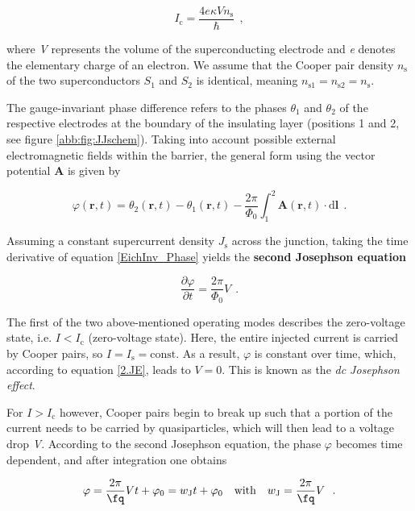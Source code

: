 \begin{equation}
I_\mathrm{c} = \frac{4e\kappa V n_\mathrm{s}}{\hbar} \ \ ,
\end{equation}

where \textit{V} represents the volume of the superconducting electrode and \textit{e} denotes the elementary charge of an electron. We assume that the Cooper pair density $n_\mathrm{s}$ of the two superconductors $S_1$ and $S_2$ is identical, meaning $n_{\mathrm{s}1} = n_{\mathrm{s}2} = n_\mathrm{s}$.

The gauge-invariant phase difference refers to the phases $\theta_1$ and $\theta_2$ of the respective electrodes at the boundary of the insulating layer (positions 1 and 2, see figure \ref{abb:fig:JJschem}). Taking into account possible external electromagnetic fields within the barrier, the general form using the vector potential \textbf{A} is given by \cite{Gross2016}

\begin{equation}
\label{EichInv_Phase}
\varphi(\textbf{r},t) = \theta_2(\textbf{r},t) - \theta_1(\textbf{r},t) - \frac{2\pi}{\Phi_0}\int_{1}^{2}\textbf{A}(\textbf{r},t)\cdot \mathrm{d}\textbf{l} \ \ .
\end{equation}

Assuming a constant supercurrent density $J_\mathrm{s}$ across the junction, taking the time derivative of equation \eqref{EichInv_Phase} yields the \textbf{second Josephson equation} \cite{Josephson1965}

\begin{equation}
\label{2.JE}
\frac{\partial\varphi}{\partial t} = \frac{2\pi}{\Phi_0}V \ \ .
\end{equation}

The first of the two above-mentioned operating modes describes the zero-voltage state, i.e.  $I<I_\mathrm{c}$ (zero-voltage state). Here, the entire injected current is carried by Cooper pairs, so $I=I_\mathrm{s}=\mathrm{const}$. As a result, $\varphi$ is constant over time, which, according to equation \eqref{2.JE}, leads to $V=0$. This is known as the \textit{dc Josephson effect}.

For $I>I_\mathrm{c}$ however, Cooper pairs begin to break up such that a portion of the current needs to be carried by quasiparticles, which will then lead to a voltage drop \textit{V}. According to the second Josephson equation, the phase $\varphi$ becomes time dependent, and after integration one obtains

\begin{equation}
\label{phi(t)}
\varphi = \frac{2\pi}{\unit{\fq}}Vt + \varphi_0 = w_\mathrm{J}t + \varphi_0 \ \ \ \mathrm{with} \ \ \ w_\mathrm{J} = \frac{2\pi}{\unit{\fq}}V \ \ .
\end{equation}

